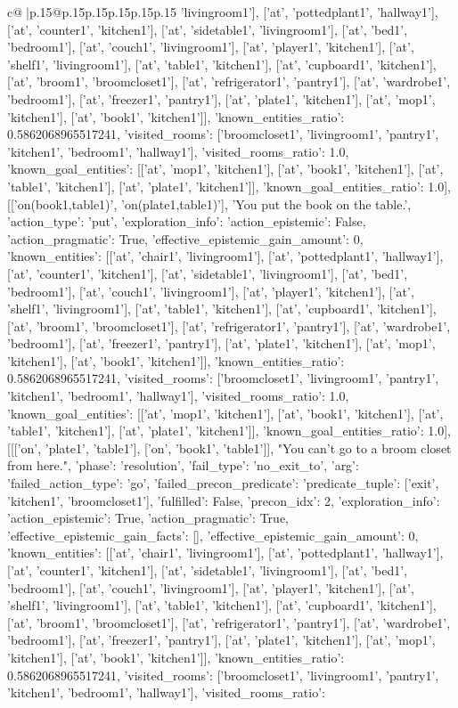 \documentclass{article}
\begin{document}
{\begin{supertabular}{c@{$\;$}|p{.15\linewidth}@{}p{.15\linewidth}p{.15\linewidth}p{.15\linewidth}p{.15\linewidth}p{.15\linewidth}}
{{{'livingroom1'], ['at', 'pottedplant1', 'hallway1'], ['at', 'counter1', 'kitchen1'], ['at', 'sidetable1', 'livingroom1'], ['at', 'bed1', 'bedroom1'], ['at', 'couch1', 'livingroom1'], ['at', 'player1', 'kitchen1'], ['at', 'shelf1', 'livingroom1'], ['at', 'table1', 'kitchen1'], ['at', 'cupboard1', 'kitchen1'], ['at', 'broom1', 'broomcloset1'], ['at', 'refrigerator1', 'pantry1'], ['at', 'wardrobe1', 'bedroom1'], ['at', 'freezer1', 'pantry1'], ['at', 'plate1', 'kitchen1'], ['at', 'mop1', 'kitchen1'], ['at', 'book1', 'kitchen1']], 'known_entities_ratio': 0.5862068965517241, 'visited_rooms': ['broomcloset1', 'livingroom1', 'pantry1', 'kitchen1', 'bedroom1', 'hallway1'], 'visited_rooms_ratio': 1.0, 'known_goal_entities': [['at', 'mop1', 'kitchen1'], ['at', 'book1', 'kitchen1'], ['at', 'table1', 'kitchen1'], ['at', 'plate1', 'kitchen1']], 'known_goal_entities_ratio': 1.0}}], [['on(book1,table1)', 'on(plate1,table1)'], 'You put the book on the table.', {'action_type': 'put', 'exploration_info': {'action_epistemic': False, 'action_pragmatic': True, 'effective_epistemic_gain_amount': 0, 'known_entities': [['at', 'chair1', 'livingroom1'], ['at', 'pottedplant1', 'hallway1'], ['at', 'counter1', 'kitchen1'], ['at', 'sidetable1', 'livingroom1'], ['at', 'bed1', 'bedroom1'], ['at', 'couch1', 'livingroom1'], ['at', 'player1', 'kitchen1'], ['at', 'shelf1', 'livingroom1'], ['at', 'table1', 'kitchen1'], ['at', 'cupboard1', 'kitchen1'], ['at', 'broom1', 'broomcloset1'], ['at', 'refrigerator1', 'pantry1'], ['at', 'wardrobe1', 'bedroom1'], ['at', 'freezer1', 'pantry1'], ['at', 'plate1', 'kitchen1'], ['at', 'mop1', 'kitchen1'], ['at', 'book1', 'kitchen1']], 'known_entities_ratio': 0.5862068965517241, 'visited_rooms': ['broomcloset1', 'livingroom1', 'pantry1', 'kitchen1', 'bedroom1', 'hallway1'], 'visited_rooms_ratio': 1.0, 'known_goal_entities': [['at', 'mop1', 'kitchen1'], ['at', 'book1', 'kitchen1'], ['at', 'table1', 'kitchen1'], ['at', 'plate1', 'kitchen1']], 'known_goal_entities_ratio': 1.0}}], [[['on', 'plate1', 'table1'], ['on', 'book1', 'table1']], "You can't go to a broom closet from here.", {'phase': 'resolution', 'fail_type': 'no_exit_to', 'arg': {'failed_action_type': 'go', 'failed_precon_predicate': {'predicate_tuple': ['exit', 'kitchen1', 'broomcloset1'], 'fulfilled': False, 'precon_idx': 2}}, 'exploration_info': {'action_epistemic': True, 'action_pragmatic': True, 'effective_epistemic_gain_facts': [], 'effective_epistemic_gain_amount': 0, 'known_entities': [['at', 'chair1', 'livingroom1'], ['at', 'pottedplant1', 'hallway1'], ['at', 'counter1', 'kitchen1'], ['at', 'sidetable1', 'livingroom1'], ['at', 'bed1', 'bedroom1'], ['at', 'couch1', 'livingroom1'], ['at', 'player1', 'kitchen1'], ['at', 'shelf1', 'livingroom1'], ['at', 'table1', 'kitchen1'], ['at', 'cupboard1', 'kitchen1'], ['at', 'broom1', 'broomcloset1'], ['at', 'refrigerator1', 'pantry1'], ['at', 'wardrobe1', 'bedroom1'], ['at', 'freezer1', 'pantry1'], ['at', 'plate1', 'kitchen1'], ['at', 'mop1', 'kitchen1'], ['at', 'book1', 'kitchen1']], 'known_entities_ratio': 0.5862068965517241, 'visited_rooms': ['broomcloset1', 'livingroom1', 'pantry1', 'kitchen1', 'bedroom1', 'hallway1'], 'visited_rooms_ratio': }}}
\end{supertabular}}
\end{document}
